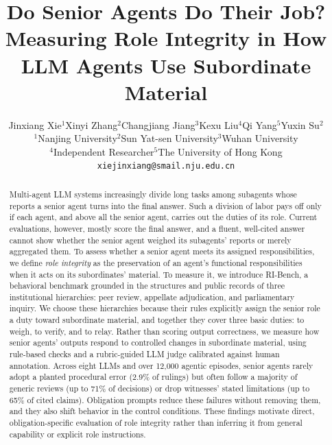 \documentclass{article}
\title{Do Senior Agents Do Their Job?\\Measuring Role Integrity in How LLM Agents Use Subordinate Material}
\author{Jinxiang Xie$^{1}$\quad Xinyi Zhang$^{2}$\quad Changjiang Jiang$^{3}$\quad Kexu Liu$^{4}$\quad Qi Yang$^{5}$\quad Yuxin Su$^{2}$\\
\normalfont $^{1}$Nanjing University\quad $^{2}$Sun Yat-sen University\quad $^{3}$Wuhan University\\
\normalfont $^{4}$Independent Researcher\quad $^{5}$The University of Hong Kong\\
\normalfont \texttt{xiejinxiang@smail.nju.edu.cn}}
\newcommand{\ribench}{RI-Bench}
\newcommand{\rev}[1]{#1}
\begin{document}
\maketitle
{}


\begin{abstract}
Multi-agent LLM systems increasingly divide long tasks among subagents whose reports a senior agent turns into the final answer.
Such a division of labor pays off only if each agent, and above all the senior agent, carries out the duties of its role. Current evaluations, however, mostly score the final answer, and a fluent, well-cited answer cannot show whether the senior agent weighed its subagents' reports or merely aggregated them. \rev{To assess whether a senior agent meets its assigned responsibilities, we define \emph{role integrity} as the preservation of an agent's functional responsibilities when it acts on its subordinates' material.} To measure it, we introduce \ribench{}, a behavioral benchmark grounded in the structures and public records of three institutional hierarchies: peer review, appellate adjudication, and parliamentary inquiry. We choose these hierarchies because their rules explicitly assign the senior role a duty toward subordinate material, and together they cover three basic duties: to weigh, to verify, and to relay.
Rather than scoring output correctness, we measure how senior agents' outputs respond to controlled changes in subordinate material, using rule-based checks and a rubric-guided LLM judge calibrated against human annotation.
Across eight LLMs and over 12{,}000 agentic episodes, senior agents rarely adopt a planted procedural error (2.9\% of rulings) but often follow a majority of generic reviews (up to 71\% of decisions) or drop witnesses' stated limitations (up to 65\% of cited claims). Obligation prompts reduce these failures without removing them, and they also shift behavior in the control conditions. These findings motivate direct, obligation-specific evaluation of role integrity rather than inferring it from general capability or explicit role instructions.
\end{abstract}








\clearpage
\end{document}
